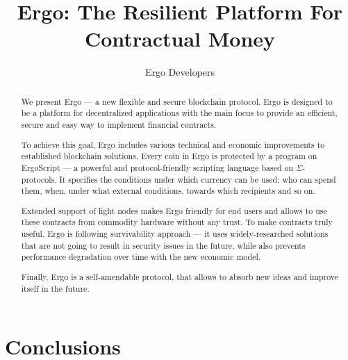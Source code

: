 \documentclass[]{article}
\begin{document}
    \title{Ergo: The Resilient Platform For Contractual Money}
    \author{Ergo Developers}


    \maketitle

    \begin{abstract}
        We present Ergo --- a new flexible and secure blockchain protocol.
        Ergo is designed to be a platform for decentralized applications with the main focus to provide
        an efficient, secure and easy way to implement financial contracts.

        To achieve this goal, Ergo includes various technical and economic improvements to established
        blockchain solutions.
        Every coin in Ergo is protected by a program on ErgoScript ---
        a powerful and protocol-friendly scripting language based on $\Sigma$-protocols.
        It specifies the conditions under which currency can be used: who can spend them,
        when, under what external conditions, towards which recipients and so on.

        Extended support of light nodes makes Ergo friendly for end users and allows to use these
        contracts from commodity hardware without any trust.
        To make contracts truly useful, Ergo is following survivability approach --- it uses
        widely-researched solutions that are not going to result in security issues in the future,
        while also prevents performance degradation over time with the new economic model.

        Finally, Ergo is a self-amendable protocol, that allows to absorb new ideas and
        improve itself in the future.
    \end{abstract}

    

    

    

    

    

    

    \section{Conclusions}
    \label{sec:conclusions}

    
\end{document}
